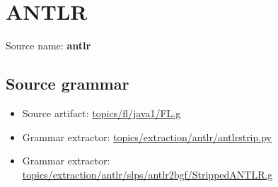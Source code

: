 \chapter{ANTLR}

 Source name: \textbf{antlr}

\section{Source grammar}

\begin{itemize}\item Source artifact: \href{http://github.com/grammarware/slps/blob/master/topics/fl/java1/FL.g}{topics/fl/java1/FL.g}\item Grammar extractor: \href{http://github.com/grammarware/slps/blob/master/topics/extraction/antlr/antlrstrip.py}{topics/extraction/antlr/antlrstrip.py}\item Grammar extractor: \href{http://github.com/grammarware/slps/blob/master/topics/extraction/antlr/slps/antlr2bgf/StrippedANTLR.g}{topics/extraction/antlr/slps/antlr2bgf/StrippedANTLR.g}\end{itemize}

